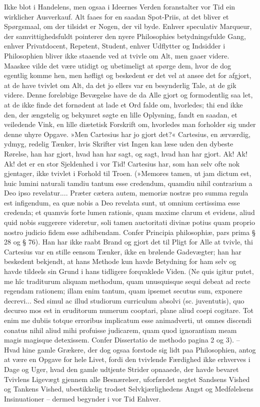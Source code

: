 \documentclass[12pt,a4paper]{article}
\begin{document}
Ikke blot i Handelens, men ogsaa i Ideernes Verden foranstalter vor Tid ein wirklicher Ausverkauf. Alt faaes for en saadan Spot-Priis, at det bliver et Spørgsmaal, om der tilsidst er Nogen, der vil byde. Enhver speculativ Marqueur, der samvittighedsfuldt pointerer den nyere Philosophies betydningsfulde Gang, enhver Privatdocent, Repetent, Student, enhver Udflytter og Indsidder i Philosophien bliver ikke staaende ved at tvivle om Alt, men gaaer videre. Maaskee vilde det være utidigt og ubetimeligt at spørge dem, hvor de dog egentlig komme hen, men høfligt og beskedent er det vel at ansee det for afgjort, at de have tvivlet om Alt, da det jo ellers var en besynderlig Tale, at de gik videre. Denne foreløbige Bevægelse have de da Alle gjort og formodentlig saa let, at de ikke finde det fornødent at lade et Ord falde om, hvorledes; thi end ikke den, der ængstelig og bekymret søgte en lille Oplysning, fandt en saadan, et veiledende Vink, en lille diætetisk Forskrift om, hvorledes man forholder sig under denne uhyre Opgave. »Men Cartesius har jo gjort det?« Cartesius, en ærværdig, ydmyg, redelig Tænker, hvis Skrifter vist Ingen kan læse uden den dybeste Rørelse, han har gjort, hvad han har sagt, og sagt, hvad han har gjort. Ak! Ak! Ak! det er en stor Sjeldenhed i vor Tid! Cartesius har, som han selv ofte nok gjentager, ikke tvivlet i Forhold til Troen. (»Memores tamen, ut jam dictum est, huic lumini naturali tamdiu tantum esse credendum, quamdiu nihil contrarium a Deo ipso revelatur.... Præter cætera autem, memoriæ nostræ pro summa regula est infigendum, ea quæ nobis a Deo revelata sunt, ut omnium certissima esse credenda; et quamvis forte lumen rationis, quam maxime clarum et evidens, aliud quid nobis suggerere videretur, soli tamen auctoritati divinæ potius quam proprio nostro judicio fidem esse adhibendam. Confer Principia philosophiæ, pars prima § 28 og § 76). Han har ikke raabt Brand og gjort det til Pligt for Alle at tvivle, thi Cartesius var en stille eensom Tænker, ikke en brølende Gadevægter; han har beskedent bekjendt, at hans Methode kun havde Betydning for ham selv og havde tildeels sin Grund i hans tidligere forqvaklede Viden. (Ne quis igitur putet, me hîc traditurum aliquam methodum, quam unusquisque sequi debeat ad recte regendam rationem; illam enim tantum, quam ipsemet secutus sum, exponere decrevi... Sed simul ac illud studiorum curriculum absolvi (sc. juventutis), quo decurso mos est in eruditorum numerum cooptari, plane aliud coepi cogitare. Tot enim me dubiis totque erroribus implicatum esse animadverti, ut omnes discendi conatus nihil aliud mihi profuisse judicarem, quam quod ignorantiam meam magis magisque detexissem. Confer Dissertatio de methodo pagina 2 og 3). – Hvad hine gamle Grækere, der dog ogsaa forstode sig lidt paa Philosophien, antog at være en Opgave for hele Livet, fordi den tvivlende Færdighed ikke erhverves i Dage og Uger, hvad den gamle udtjente Strider opnaaede, der havde bevaret Tvivlens Ligevægt gjennem alle Besnærelser, uforfærdet negtet Sandsens Vished og Tankens Vished, ubestikkelig trodset Selvkjærlighedens Angst og Medfølelsens Insinuationer – dermed begynder i vor Tid Enhver.
\end{document}
